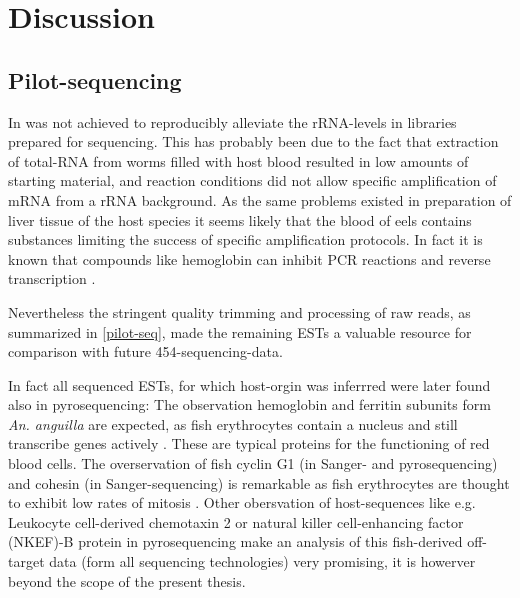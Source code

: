 
\chapter{Discussion} %



\ifpdf
    \graphicspath{{7_discussion/figures/PNG/}{7_discussion/figures/PDF/}{7_discussion/figures/}}
\else
    \graphicspath{{7_discussion/figures/EPS/}{7_discussion/figures/}}
\fi




\section{Pilot-sequencing}
\label{sec:sanger-pil}

In was not achieved to reproducibly alleviate the rRNA-levels in
libraries prepared for sequencing. This has probably been due to the
fact that extraction of total-RNA from worms filled with host blood
resulted in low amounts of starting material, and reaction conditions
did not allow specific amplification of mRNA from a rRNA
background. As the same problems existed in preparation of liver
tissue of the host species it seems likely that the blood of eels
contains substances limiting the success of specific amplification
protocols. In fact it is known that compounds like hemoglobin can
inhibit PCR reactions \cite{pmid9327537} and reverse transcription
\cite{pmid16109794}.

Nevertheless the stringent quality trimming and processing of raw
reads, as summarized in \ref{pilot-seq}, made the remaining ESTs a
valuable resource for comparison with future 454-sequencing-data.

In fact all sequenced ESTs, for which host-orgin was inferrred were
later found also in pyrosequencing: The observation hemoglobin and
ferritin subunits form \textit{An. anguilla} are expected, as fish
erythrocytes contain a nucleus and still transcribe genes actively
\cite{pmid20614118}. These are typical proteins for the functioning of
red blood cells. The overservation of fish cyclin G1 (in Sanger- and
pyrosequencing) and cohesin (in Sanger-sequencing) is remarkable as
fish erythrocytes are thought to exhibit low rates of mitosis
\cite{pmid7506383}. Other obersvation of host-sequences like
e.g. Leukocyte cell-derived chemotaxin 2 or natural killer
cell-enhancing factor (NKEF)-B protein in pyrosequencing make an
analysis of this fish-derived off-target data (form all sequencing
technologies) very promising, it is howerver beyond the scope of the
present thesis.

